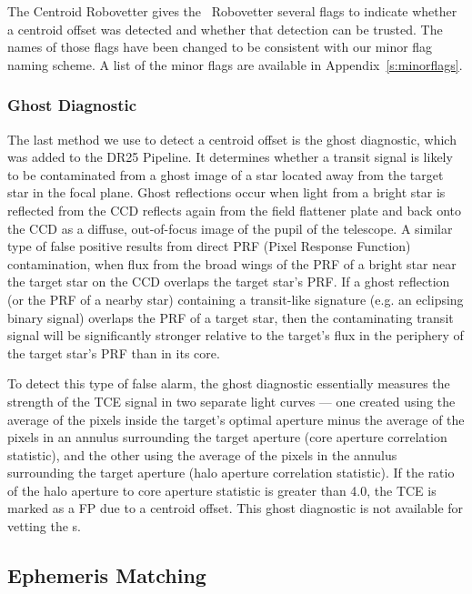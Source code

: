 The Centroid Robovetter gives the \kepler\ Robovetter several flags to indicate whether a centroid offset was detected and whether that detection can be trusted. The names of those flags have been changed to be consistent with our minor flag naming scheme. A list of the minor flags are available in Appendix~\ref{s:minorflags}.


\subsubsection{Ghost Diagnostic}
\label{s:ghost}
The last method we use to detect a centroid offset is the ghost diagnostic, which was added to the DR25 \kepler{} Pipeline. It determines whether a transit signal is likely to be contaminated from a ghost image of a star located away from the target star in the focal plane. Ghost reflections occur when light from a bright star is reflected from the CCD reflects again from the field flattener plate and back onto the CCD as a diffuse, out-of-focus image of the pupil of the telescope. A similar type of false positive results from direct PRF (Pixel Response Function) contamination, when flux from the broad wings of the PRF of a bright star near the target star on the CCD overlaps the target star's PRF.  If a ghost reflection (or the PRF of a nearby star) containing a transit-like signature (e.g. an eclipsing binary signal) overlaps the PRF of a target star, then the contaminating transit signal will be significantly stronger relative to the target's flux in the periphery of the target star's PRF than in its core.

To detect this type of false alarm, the ghost diagnostic essentially measures the strength of the TCE signal in two separate light curves --- one created using the average of the pixels inside the target's optimal aperture minus the average of the pixels in an annulus surrounding the target aperture (core aperture correlation statistic), and the other using the average of the pixels in the annulus surrounding the target aperture (halo aperture correlation statistic). If the ratio of the halo aperture to core aperture statistic is greater than 4.0, the TCE is marked as a FP due to a centroid offset. This ghost diagnostic is not available for vetting the \scrtce s. 



\subsection{Ephemeris Matching}
\label{ephemmatchsec}
\label{s:ephemmatch}

